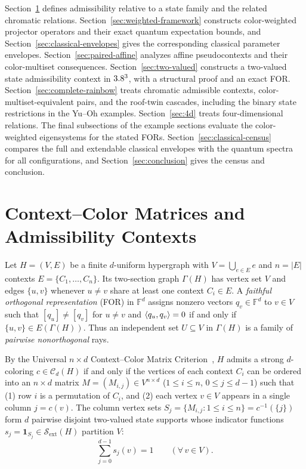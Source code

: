 \documentclass[aps,pra,reprint,superscriptaddress,longbibliography,nofootinbib,floatfix,10pt]{revtex4-2}
\theoremstyle{definition}\newtheorem{definition}[theorem]{Definition}
\theoremstyle{remark}\newtheorem{remark}[theorem]{Remark}
\newcommand{\F}{\mathbb F}\newcommand{\Z}{\mathbb Z}\newcommand{\PP}{\mathbb P}
\newcommand{\Sc}{\mathcal S}\newcommand{\Cc}{\mathcal C}\newcommand{\Wc}{\mathcal W}
\begin{document}
Section~\ref{sec:framework} defines admissibility relative to a state family and the related chromatic relations. Section~\ref{sec:weighted-framework} constructs color-weighted projector operators and their exact quantum expectation bounds, and Section~\ref{sec:classical-envelopes} gives the corresponding classical parameter envelopes. Section~\ref{sec:paired-affine} analyzes affine pseudocontexts and their color-multiset consequences. Section~\ref{sec:two-valued} constructs a two-valued state admissibility context in $3.8^3$, with a structural proof and an exact FOR. Section~\ref{sec:complete-rainbow} treats chromatic admissible contexts, color-multiset-equivalent pairs, and the roof-twin cascades, including the binary state restrictions in the Yu--Oh examples. Section~\ref{sec:4d} treats four-dimensional relations. The final subsections of the example sections evaluate the color-weighted eigensystems for the stated FORs. Section~\ref{sec:classical-census} compares the full and extendable classical envelopes with the quantum spectra for all configurations, and Section~\ref{sec:conclusion} gives the census and conclusion.

\section{Context--Color Matrices and Admissibility Contexts}\label{sec:framework}

Let $H=(V,E)$ be a finite $d$-uniform hypergraph with $V=\bigcup_{e\in E}e$ and $n=|E|$ contexts $E=\{C_1,\ldots,C_n\}$. Its two-section graph $\Gamma(H)$ has vertex set $V$ and edges $\{u,v\}$ whenever $u\neq v$ share at least one context $C_i\in E$. A \emph{faithful orthogonal representation} (FOR) in $\F^d$ assigns nonzero vectors $q_v\in\F^d$ to $v\in V$ such that $[q_u]\neq[q_v]$ for $u\neq v$ and $\langle q_u,q_v\rangle=0$ if and only if $\{u,v\}\in E(\Gamma(H))$. Thus an independent set $U\subseteq V$ in $\Gamma(H)$ is a family of \emph{pairwise nonorthogonal} rays.

By the Universal $n\times d$ Context--Color Matrix Criterion~\cite[Theorem~1]{2026-latin-context-matrix}, $H$ admits a strong $d$-coloring $c\in\Cc_d(H)$ if and only if the vertices of each context $C_i$ can be ordered into an $n\times d$ matrix $M=(M_{i,j})\in V^{n\times d}$ ($1\le i\le n$, $0\le j\le d-1$) such that (1) row $i$ is a permutation of $C_i$, and (2) each vertex $v\in V$ appears in a single column $j=c(v)$. The column vertex sets $S_j=\{M_{i,j}:1\le i\le n\}=c^{-1}(\{j\})$ form $d$ pairwise disjoint two-valued state supports whose indicator functions $s_j=\mathbf{1}_{S_j}\in\Sc_{\mathrm{ext}}(H)$ partition $V$:
\begin{equation}\label{eq:color-class-partition}
\sum_{j=0}^{d-1} s_j(v) = 1 \qquad (\forall\, v\in V).
\end{equation}
\end{document}
